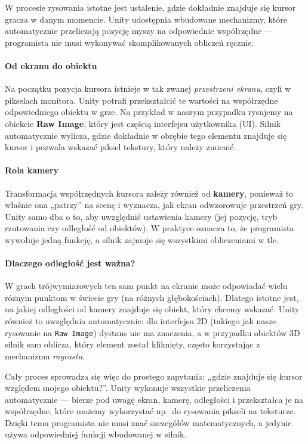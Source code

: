\documentclass[a4paper,12pt]{book} %
\begin{document}
W procesie rysowania istotne jest ustalenie, gdzie dokładnie znajduje się kursor gracza w danym momencie. 
Unity udostępnia wbudowane mechanizmy, które automatycznie przeliczają pozycję myszy na odpowiednie współrzędne --- programista nie musi wykonywać skomplikowanych obliczeń ręcznie.  

\paragraph{Od ekranu do obiektu}
Na początku pozycja kursora istnieje w tak zwanej \emph{przestrzeni ekranu}, czyli w pikselach monitora. 
Unity potrafi przekształcić te wartości na współrzędne odpowiedniego obiektu w grze. 
Na przykład w naszym przypadku rysujemy na obiekcie \textbf{Raw Image}, który jest częścią interfejsu użytkownika (UI). 
Silnik automatycznie wylicza, gdzie dokładnie w obrębie tego elementu znajduje się kursor i pozwala wskazać piksel tekstury, który należy zmienić.

\paragraph{Rola kamery}
Transformacja współrzędnych kursora zależy również od \textbf{kamery}, ponieważ to właśnie ona „patrzy” na scenę i wyznacza, jak ekran odwzorowuje przestrzeń gry.  
Unity samo dba o to, aby uwzględnić ustawienia kamery (jej pozycję, tryb rzutowania czy odległość od obiektów). 
W praktyce oznacza to, że programista wywołuje jedną funkcję, a silnik zajmuje się wszystkimi obliczeniami w tle.

\paragraph{Dlaczego odległość jest ważna?}
W grach trójwymiarowych ten sam punkt na ekranie może odpowiadać wielu różnym punktom w świecie gry (na różnych głębokościach). 
Dlatego istotne jest, na jakiej odległości od kamery znajduje się obiekt, który chcemy wskazać.  
Unity również to uwzględnia automatycznie: dla interfejsu 2D (takiego jak nasze rysowanie na \texttt{Raw Image}) dystans nie ma znaczenia, a w przypadku obiektów 3D silnik sam oblicza, który element został kliknięty, często korzystając z mechanizmu \emph{raycastu}.

Cały proces sprowadza się więc do prostego zapytania: „gdzie znajduje się kursor względem mojego obiektu?”.  
Unity wykonuje wszystkie przeliczenia automatycznie — bierze pod uwagę ekran, kamerę, odległości i przekształca je na współrzędne, które możemy wykorzystać np.\ do rysowania pikseli na teksturze. 
Dzięki temu programista nie musi znać szczegółów matematycznych, a jedynie używa odpowiedniej funkcji wbudowanej w silnik.
\end{document}
